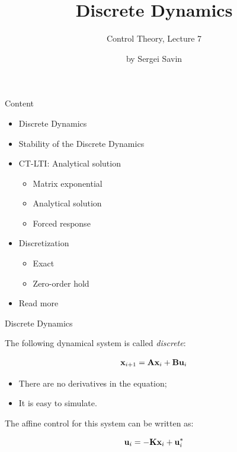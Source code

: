 \documentclass{beamer}
\title{Discrete Dynamics}
\subtitle{Control Theory, Lecture 7}
\author{by Sergei Savin}
\date{\mydate}
\begin{document}
\maketitle


\begin{frame}{Content}

\begin{itemize}
\item Discrete Dynamics
\item Stability of the Discrete Dynamics
\item CT-LTI: Analytical solution
\begin{itemize}
    \item Matrix exponential
    \item Analytical solution
    \item Forced response
\end{itemize}
\item Discretization
\begin{itemize}
	\item Exact
	\item Zero-order hold
\end{itemize}
\item Read more
\end{itemize}

\end{frame}





\begin{frame}{Discrete Dynamics}
\begin{flushleft}

The following dynamical system is called \emph{discrete}:

\begin{equation}
    \mathbf{x}_{i+1} = \mathbf{A}\mathbf{x}_i + \mathbf{B}\mathbf{u}_i
\end{equation}


\begin{itemize}
    \item There are no derivatives in the equation;
    \item It is easy to simulate.
\end{itemize}

\bigskip

The affine control for this system can be written as:

\begin{equation}
    \mathbf{u}_i = -\mathbf{K}\mathbf{x}_i + \mathbf{u}_i^*
\end{equation}

\end{flushleft}
\end{frame}
\end{document}
